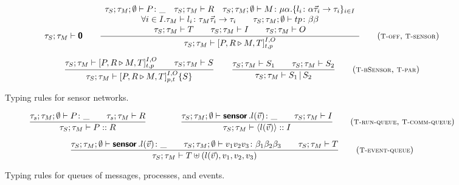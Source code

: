 \documentclass[copyright,creativecommons]{eptcs}
\newcommand{\keyw}[1]{\textbf{\textsf{#1}}\,}
\newcommand{\inaction}{\textbf{\textsf{0}}}
\newcommand{\branek}{\keyw{sensor}}
\newcommand{\sensor}[6]{[{#1} \triangleright {#2}]^{{#3}, {#4}}_{{#5}, {#6}}}
\newcommand{\sensord}{\sensor {P,R} {M, T} I O t p}
\newcommand{\tagsensor}[7]{[{#1}\triangleright{#2}]^{{#3}, {#4}}_{{#5}, {#6}}\{{#7}\}}
\newcommand{\tagsensord}{\tagsensor {P,R} {M,T} I O p t S}
\newcommand{\invk}[3]{{#1}.{#2}({#3})}
\newcommand{\msg}[2]{{#1}({#2})}
\newcommand{\msgd}{\msg l {\vec v}}
\newcommand{\parn}{\,\vert\,}
\def\obj#1{\{#1\}}
\newcommand{\functionType}[2]{{#1} \rightarrow {#2}}
\newcommand{\recType}[2]{\mu {#1}.{#2}}
\newcommand{\mkTrule}[1]{{\footnotesize \textsc{T-#1}}}
\newcommand{\type}{\vdash}
\newcommand{\TSinaction}{\mkTrule{off}}
\newcommand{\Tparallel}{\mkTrule{par}}
\newcommand{\TrunQueue}{\mkTrule{run-queue}}
\newcommand{\TcommQueue}{\mkTrule{comm-queue}}
\newcommand{\TeventQueue}{\mkTrule{event-queue}}
\newcommand{\TSsensor}{\mkTrule{sensor}}
\newcommand{\TSbSensor}{\mkTrule{bSensor}}
\newcommand{\rulespace}{0.2cm}
\begin{document}
\begin{figure}
\begin{gather*}
   \tau_S;\tau_M \type \inaction
   \qquad
   \frac{
     \begin{array}{c}
       \tau_S;\tau_M;\emptyset \type P \colon \_
       \quad
       \tau_S;\tau_M \type R 
       \quad
       \tau_S;\tau_M;\emptyset \type M \colon 
       \recType \alpha 
          {\obj{l_i \colon \functionType {\alpha \vec \tau_i}
              {\tau_i}}_{i \in I}}
       \\
       \forall i \in I.\tau_M \type l_i \colon 
       \functionType {\tau_M \vec \tau_i} {\tau_i}
       \qquad
       \tau_S;\tau_M; \emptyset \type t p \colon \beta \beta
       \\
       \tau_S;\tau_M \type T 
       \qquad 
       \tau_S;\tau_M \type I 
       \qquad 
       \tau_S;\tau_M \type O 
     \end{array}
   }
   {
     \tau_S;\tau_M \type \sensord
   }
   \tag{\TSinaction, \TSsensor}
   \\[\rulespace]
   \frac{
     \tau_S;\tau_M \type \sensord
     \qquad
     \tau_S;\tau_M \type S
   }
   {
     \tau_S;\tau_M \type \tagsensord 
   }
   \qquad
   \frac{
     \tau_S;\tau_M \type S_1 
     \qquad
     \tau_S;\tau_M \type S_2
   }
   {
     \tau_S;\tau_M \type S_1 \parn S_2
   }
   \tag{\TSbSensor, \Tparallel}
 \end{gather*}
\caption{Typing rules for sensor networks.}
\label{fig:type-system-sensors}
\end{figure}



\begin{figure}
  \begin{gather*}
    \frac{
      \tau_s;\tau_M;\emptyset \type P \colon \_
      \qquad
      \tau_s;\tau_M \type R
    }
    {
      \tau_S;\tau_M \type P::R
    }
    \qquad \qquad
    \frac{
      \tau_S;\tau_M;\emptyset \type \invk \branek l {\vec v} \colon \_
      \qquad
      \tau_S;\tau_M \type I
    }
    {
      \tau_S;\tau_M \type \langle \msgd \rangle :: I
    }
    \tag{\TrunQueue, \TcommQueue}
    \\[\rulespace]
    \frac{
      \tau_S;\tau_M;\emptyset \type \invk \branek l {\vec v} \colon \_
      \qquad
      \tau_S;\tau_M;\emptyset \type v_1 v_2 v_3 \colon \beta_1 \beta_2 \beta_3
      \qquad
      \tau_S;\tau_M \type T
    }
    {
      \tau_S;\tau_M \type T \uplus (\msgd, v_1, v_2, v_3) 
    }
    \tag{\TeventQueue}
  \end{gather*}
  \caption{Typing rules for queues of messages, processes, and events.}
  \label{fig:type-system-queues}
\end{figure}
\end{document}
